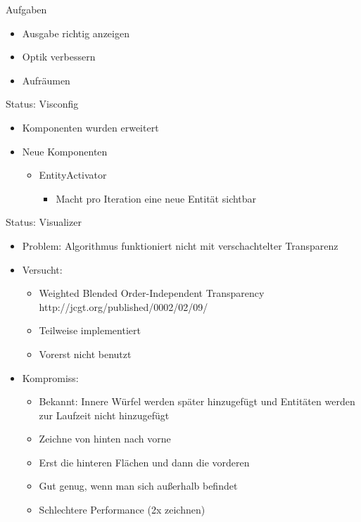 \documentclass{../presentation}
\begin{document}
\frame[plain]{\titlepage}

\begin{frame}{Aufgaben}
    \begin{itemize}
        \item Ausgabe richtig anzeigen
        \item Optik verbessern
        \item Aufräumen
    \end{itemize}
\end{frame}

\begin{frame}{Status: Visconfig}
    \begin{itemize}
        \item Komponenten wurden erweitert
        \item Neue Komponenten
        \begin{itemize}
            \item EntityActivator
            \begin{itemize}
                \item Macht pro Iteration eine neue Entität sichtbar
            \end{itemize}
        \end{itemize}
    \end{itemize}
\end{frame}

\begin{frame}{Status: Visualizer}
    \begin{itemize}
        \item Problem: Algorithmus funktioniert nicht mit verschachtelter Transparenz
        \item Versucht:
        \begin{itemize}
            \item Weighted Blended Order-Independent Transparency http://jcgt.org/published/0002/02/09/
            \item Teilweise implementiert
            \item Vorerst nicht benutzt
        \end{itemize}
        \item Kompromiss:
        \begin{itemize}
            \item Bekannt: Innere Würfel werden später hinzugefügt und Entitäten
                werden zur Laufzeit nicht hinzugefügt
            \item Zeichne von hinten nach vorne
            \item Erst die hinteren Flächen und dann die vorderen
            \item Gut genug, wenn man sich außerhalb befindet
            \item Schlechtere Performance (2x zeichnen)
        \end{itemize}
    \end{itemize}
\end{frame}
\end{document}
